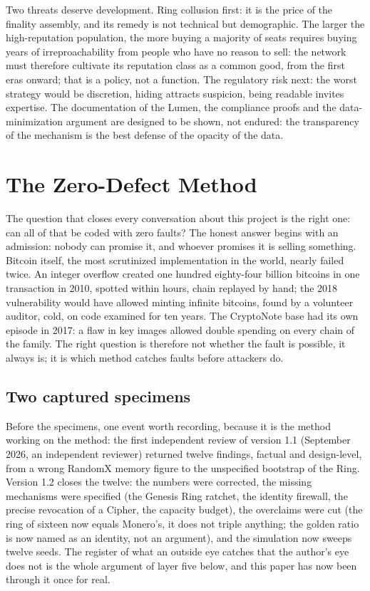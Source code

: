 Two threats deserve development. Ring collusion first: it is the price
of the finality assembly, and its remedy is not technical but
demographic. The larger the high-reputation population, the more buying a
majority of seats requires buying years of irreproachability from people
who have no reason to sell: the network must therefore cultivate its
reputation class as a common good, from the first eras onward; that is a
policy, not a function. The regulatory risk next: the worst strategy
would be discretion, hiding attracts suspicion, being readable invites
expertise. The documentation of the Lumen, the compliance proofs and the
data-minimization argument are designed to be shown, not endured: the
transparency of the mechanism is the best defense of the opacity of the
data.

\section{The Zero-Defect Method}\label{sec:method}

The question that closes every conversation about this project is the
right one: can all of that be coded with zero faults? The honest
answer begins with an admission: nobody can promise it, and
whoever promises it is selling something. Bitcoin itself, the most
scrutinized implementation in the world, nearly failed twice. An integer
overflow created one hundred eighty-four billion bitcoins in one
transaction in 2010, spotted within hours, chain replayed by hand; the
2018 vulnerability would have allowed minting infinite bitcoins, found
by a volunteer auditor, cold, on code examined for ten years. The
CryptoNote base had its own episode in 2017: a flaw in key images
allowed double spending on every chain of the family. The right question
is therefore not whether the fault is possible, it always is; it is
which method catches faults before attackers do.

\subsection{Two captured specimens}

Before the specimens, one event worth recording, because it is the
method working on the method: the first independent review of version 1.1
(September 2026, an independent reviewer) returned twelve findings,
factual and design-level, from a wrong RandomX memory figure to the
unspecified bootstrap of the Ring. Version 1.2 closes the twelve:
the numbers were corrected, the missing mechanisms were specified
(the Genesis Ring ratchet, the identity firewall, the precise
revocation of a Cipher, the capacity budget), the overclaims were cut
(the ring of sixteen now equals Monero's, it does not triple anything;
the golden ratio is now named as an identity, not an argument), and
the simulation now sweeps twelve seeds. The register of what an
outside eye catches that the author's eye does not is the whole
argument of layer five below, and this paper has now been through it
once for real.

